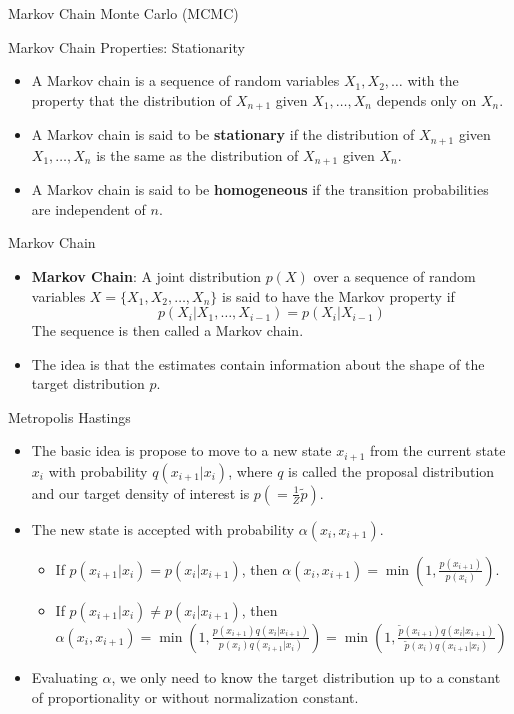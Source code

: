 \documentclass{beamer}
\begin{document}
\begin{section}{Markov Chain Monte Carlo (MCMC)}
    \begin{frame}{Markov Chain Properties: Stationarity}
        \begin{itemize}
            \item A Markov chain is a sequence of random variables $X_1, X_2, \ldots$ with the property that the distribution of $X_{n+1}$ given $X_1, \ldots, X_n$ depends only on $X_n$.
            \item A Markov chain is said to be \textbf{stationary} if the distribution of $X_{n+1}$ given $X_1, \ldots, X_n$ is the same as the distribution of $X_{n+1}$ given $X_n$.
            \item A Markov chain is said to be \textbf{homogeneous} if the transition probabilities are independent of $n$.
        \end{itemize}

        
    \end{frame}

    \begin{frame}{Markov Chain}
        \begin{itemize}
            \item \textbf{Markov Chain}: A joint distribution $p(X)$ over a sequence of random variables $X = \{X_1, X_2, \ldots, X_n\}$ is said to have the Markov property if 
            $$
            p(X_i|X_1, \ldots, X_{i-1}) = p(X_i|X_{i-1}) 
            $$
            The sequence is then called a Markov chain.
            \item The idea is that the estimates contain information about the shape of the target distribution $p$.
        \end{itemize}
    \end{frame}

    \begin{frame}{Metropolis Hastings}
        \begin{itemize}
            \item The basic idea is propose to move to a new state $x_{i+1}$ from the current state $x_i$ with probability $q(x_{i+1}|x_i)$, where $q$ is called the proposal distribution and our target density of interest is $p (= \frac{1}{Z} \tilde{p})$.
            \item The new state is accepted with probability $\alpha(x_i, x_{i+1})$.
            \begin{itemize}
                \item If $p(x_{i+1}| x_i) = p(x_i| x_{i+1})$, then $\alpha(x_i, x_{i+1}) = \min (1, \frac{p(x_{i+1})}{p(x_i)})$.
                \item If $p(x_{i+1}| x_i) \neq p(x_i| x_{i+1})$, then $\alpha(x_i, x_{i+1}) = \min (1, \frac{p(x_{i+1})q(x_i|x_{i+1})}{p(x_i)q(x_{i+1}|x_i)}) = \min (1, \frac{\tilde{p}(x_{i+1})q(x_i|x_{i+1})}{\tilde{p}(x_i)q(x_{i+1}|x_i)})$
            \end{itemize}
            \item Evaluating $\alpha$, we only need to know the target distribution up to a constant of proportionality or without normalization constant.
        \end{itemize}
    \end{frame}


\end{section}
\end{document}
